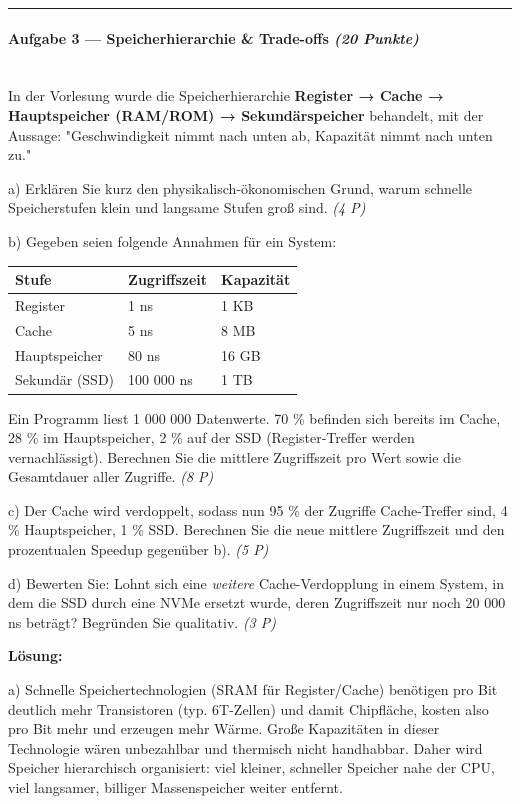 \documentclass[11pt, a4paper]{article}
\begin{document}
\noindent\textcolor{rulegray}{\rule{\linewidth}{0.4pt}}


\paragraph{Aufgabe 3 — Speicherhierarchie \& Trade-offs \textit{(20 Punkte)}}\mbox{}\\[2pt]

In der Vorlesung wurde die Speicherhierarchie \textbf{Register → Cache → Hauptspeicher (RAM/ROM) → Sekundärspeicher} behandelt, mit der Aussage: "Geschwindigkeit nimmt nach unten ab, Kapazität nimmt nach unten zu."


a) Erklären Sie kurz den physikalisch-ökonomischen Grund, warum schnelle Speicherstufen klein und langsame Stufen groß sind. \textit{(4 P)}


b) Gegeben seien folgende Annahmen für ein System:



{\small
\begin{tabularx}{\linewidth}{XXX}
\hline
\rowcolor{tableheadbg}
{\color{white}\textbf{Stufe}} & {\color{white}\textbf{Zugriffszeit}} & {\color{white}\textbf{Kapazität}} \\[2pt]
\hline
\endhead
\hline
\endfoot
Register & 1 ns & 1 KB \\
Cache & 5 ns & 8 MB \\
Hauptspeicher & 80 ns & 16 GB \\
Sekundär (SSD) & 100 000 ns & 1 TB \\
\end{tabularx}
}


Ein Programm liest 1 000 000 Datenwerte. 70 \% befinden sich bereits im Cache, 28 \% im Hauptspeicher, 2 \% auf der SSD (Register-Treffer werden vernachlässigt). Berechnen Sie die mittlere Zugriffszeit pro Wert sowie die Gesamtdauer aller Zugriffe. \textit{(8 P)}


c) Der Cache wird verdoppelt, sodass nun 95 \% der Zugriffe Cache-Treffer sind, 4 \% Hauptspeicher, 1 \% SSD. Berechnen Sie die neue mittlere Zugriffszeit und den prozentualen Speedup gegenüber b). \textit{(5 P)}


d) Bewerten Sie: Lohnt sich eine \textit{weitere} Cache-Verdopplung in einem System, in dem die SSD durch eine NVMe ersetzt wurde, deren Zugriffszeit nur noch 20 000 ns beträgt? Begründen Sie qualitativ. \textit{(3 P)}


\textbf{Lösung:}


a) Schnelle Speichertechnologien (SRAM für Register/Cache) benötigen pro Bit deutlich mehr Transistoren (typ. 6T-Zellen) und damit Chipfläche, kosten also pro Bit mehr und erzeugen mehr Wärme. Große Kapazitäten in dieser Technologie wären unbezahlbar und thermisch nicht handhabbar. Daher wird Speicher hierarchisch organisiert: viel kleiner, schneller Speicher nahe der CPU, viel langsamer, billiger Massenspeicher weiter entfernt.
\end{document}

